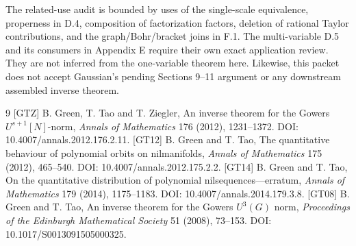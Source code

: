 \documentclass[11pt]{article}
\begin{document}
The related-use audit is bounded by uses of the single-scale equivalence,
properness in D.4, composition of factorization factors, deletion of rational
Taylor contributions, and the graph/Bohr/bracket joins in F.1. The
multi-variable D.5 and its consumers in Appendix E require their own exact
application review. They are not inferred from the one-variable theorem here.
Likewise, this packet does not accept Gaussian's pending Sections 9--11
argument or any downstream assembled inverse theorem.
\begin{thebibliography}{9}
[GTZ] B. Green, T. Tao and T. Ziegler,
An inverse theorem for the Gowers $U^{s+1}[N]$-norm,
\emph{Annals of Mathematics} 176 (2012), 1231--1372.
DOI: 10.4007/annals.2012.176.2.11.
[GT12] B. Green and T. Tao,
The quantitative behaviour of polynomial orbits on nilmanifolds,
\emph{Annals of Mathematics} 175 (2012), 465--540.
DOI: 10.4007/annals.2012.175.2.2.
[GT14] B. Green and T. Tao,
On the quantitative distribution of polynomial nilsequences---erratum,
\emph{Annals of Mathematics} 179 (2014), 1175--1183.
DOI: 10.4007/annals.2014.179.3.8.
[GT08] B. Green and T. Tao,
An inverse theorem for the Gowers $U^3(G)$ norm,
\emph{Proceedings of the Edinburgh Mathematical Society} 51 (2008), 73--153.
DOI: 10.1017/S0013091505000325.
\end{thebibliography}
\end{document}
